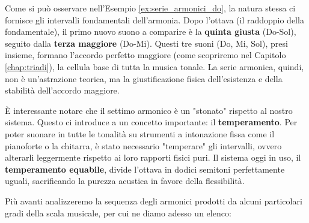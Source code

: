 Come si può osservare nell'Esempio \ref{ex:serie_armonici_do}, la natura stessa ci fornisce gli intervalli fondamentali dell'armonia. Dopo l'ottava (il raddoppio della fondamentale), il primo nuovo suono a comparire è la \textbf{quinta giusta} (Do-Sol), seguito dalla \textbf{terza maggiore} (Do-Mi). Questi tre suoni (Do, Mi, Sol), presi insieme, formano l'accordo perfetto maggiore (come scopriremo nel Capitolo \ref{chap:triadi}), la cellula base di tutta la musica tonale. La serie armonica, quindi, non è un'astrazione teorica, ma la giustificazione fisica dell'esistenza e della stabilità dell'accordo maggiore.

È interessante notare che il settimo armonico è un \Sibemolle  "stonato" rispetto al nostro sistema. Questo ci introduce a un concetto importante: il \textbf{temperamento}. Per poter suonare in tutte le tonalità su strumenti a intonazione fissa come il pianoforte o la chitarra, è stato necessario "temperare" gli intervalli, ovvero alterarli leggermente rispetto ai loro rapporti fisici puri. Il sistema oggi in uso, il \textbf{temperamento equabile}, divide l'ottava in dodici semitoni perfettamente uguali, sacrificando la purezza acustica in favore della flessibilità.

Più avanti analizzeremo la sequenza degli armonici prodotti da alcuni particolari gradi della scala musicale, per cui ne diamo adesso un elenco:

